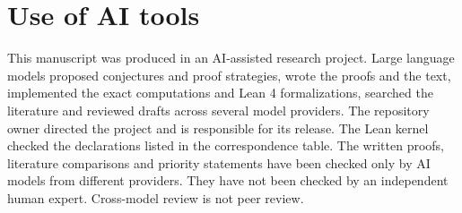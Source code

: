 \documentclass[11pt]{article}
\begin{document}
\section*{Use of AI tools}
This manuscript was produced in an AI-assisted research project. Large language models proposed conjectures and proof strategies, wrote the proofs and the text, implemented the exact computations and Lean 4 formalizations, searched the literature and reviewed drafts across several model providers. The repository owner directed the project and is responsible for its release. The Lean kernel checked the declarations listed in the correspondence table. The written proofs, literature comparisons and priority statements have been checked only by AI models from different providers. They have not been checked by an independent human expert. Cross-model review is not peer review.


\begingroup
\let\originalbibliography\thebibliography
\renewcommand{\thebibliography}[1]{\originalbibliography{#1}\small\setlength{\itemsep}{2pt}}

\endgroup
\end{document}
